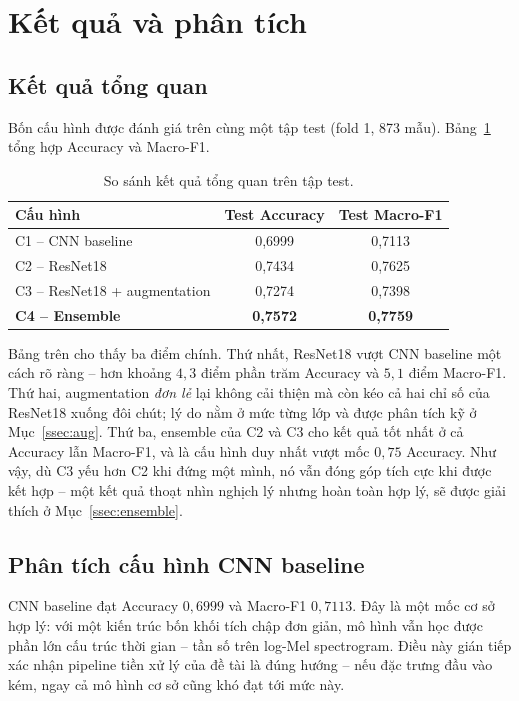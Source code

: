 \section{Kết quả và phân tích}
\label{sec:results}

\subsection{Kết quả tổng quan}

Bốn cấu hình được đánh giá trên cùng một tập test (fold 1, 873 mẫu).
Bảng~\ref{tab:overall} tổng hợp Accuracy và Macro-F1.

\begin{table}[H]
\centering
\caption{So sánh kết quả tổng quan trên tập test.}
\label{tab:overall}
\begin{tabular}{lcc}
\toprule
\textbf{Cấu hình} & \textbf{Test Accuracy} & \textbf{Test Macro-F1}\\
\midrule
C1 -- CNN baseline            & 0{,}6999 & 0{,}7113\\
C2 -- ResNet18                & 0{,}7434 & 0{,}7625\\
C3 -- ResNet18 + augmentation & 0{,}7274 & 0{,}7398\\
\textbf{C4 -- Ensemble}       & \textbf{0{,}7572} & \textbf{0{,}7759}\\
\bottomrule
\end{tabular}
\end{table}

Bảng trên cho thấy ba điểm chính. Thứ nhất, ResNet18 vượt CNN baseline một cách
rõ ràng -- hơn khoảng $4{,}3$ điểm phần trăm Accuracy và $5{,}1$ điểm Macro-F1.
Thứ hai, augmentation \textit{đơn lẻ} lại không cải thiện mà còn kéo cả hai chỉ
số của ResNet18 xuống đôi chút; lý do nằm ở mức từng lớp và được phân tích kỹ ở
Mục~\ref{ssec:aug}. Thứ ba, ensemble của C2 và C3 cho kết quả tốt nhất ở cả
Accuracy lẫn Macro-F1, và là cấu hình duy nhất vượt mốc $0{,}75$ Accuracy. Như
vậy, dù C3 yếu hơn C2 khi đứng một mình, nó vẫn đóng góp tích cực khi được kết
hợp -- một kết quả thoạt nhìn nghịch lý nhưng hoàn toàn hợp lý, sẽ được giải
thích ở Mục~\ref{ssec:ensemble}.

\subsection{Phân tích cấu hình CNN baseline}

CNN baseline đạt Accuracy $0{,}6999$ và Macro-F1 $0{,}7113$. Đây là một mốc cơ sở
hợp lý: với một kiến trúc bốn khối tích chập đơn giản, mô hình vẫn học được phần
lớn cấu trúc thời gian -- tần số trên log-Mel spectrogram. Điều này gián tiếp xác
nhận pipeline tiền xử lý của đề tài là đúng hướng -- nếu đặc trưng đầu vào kém,
ngay cả mô hình cơ sở cũng khó đạt tới mức này.

